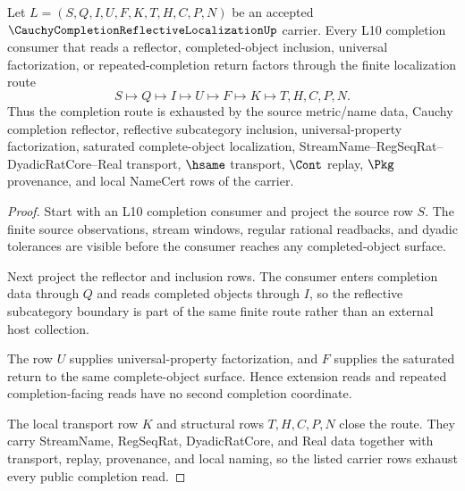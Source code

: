 \begin{theorem}
\label{thm:cauchy-completion-reflective-localization-universal-exhaustion}
Let $L=(S,Q,I,U,F,K,T,H,C,P,N)$ be an accepted $\CauchyCompletionReflectiveLocalizationUp$ carrier. Every L10 completion consumer that reads a reflector, completed-object inclusion, universal factorization, or repeated-completion return factors through the finite localization route
$$
S\longmapsto Q\longmapsto I\longmapsto U\longmapsto F\longmapsto K\longmapsto T,H,C,P,N .
$$
Thus the completion route is exhausted by the source metric/name data, Cauchy completion reflector, reflective subcategory inclusion, universal-property factorization, saturated complete-object localization, StreamName--RegSeqRat--DyadicRatCore--Real transport, $\hsame$ transport, $\Cont$ replay, $\Pkg$ provenance, and local NameCert rows of the carrier.
\end{theorem}
\begin{proof}
Start with an L10 completion consumer and project the source row $S$. The finite source observations, stream windows, regular rational readbacks, and dyadic tolerances are visible before the consumer reaches any completed-object surface.

Next project the reflector and inclusion rows. The consumer enters completion data through $Q$ and reads completed objects through $I$, so the reflective subcategory boundary is part of the same finite route rather than an external host collection.

The row $U$ supplies universal-property factorization, and $F$ supplies the saturated return to the same complete-object surface. Hence extension reads and repeated completion-facing reads have no second completion coordinate.

The local transport row $K$ and structural rows $T,H,C,P,N$ close the route. They carry StreamName, RegSeqRat, DyadicRatCore, and Real data together with transport, replay, provenance, and local naming, so the listed carrier rows exhaust every public completion read.
\end{proof}

